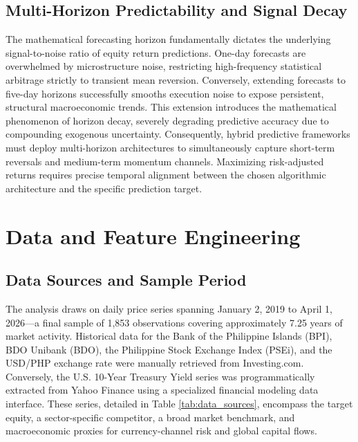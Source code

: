 \documentclass[12pt]{article}
\begin{document}
\subsection{Multi-Horizon Predictability and Signal Decay}
The mathematical forecasting horizon fundamentally dictates the underlying signal-to-noise ratio of equity return predictions. One-day forecasts are overwhelmed by microstructure noise, restricting high-frequency statistical arbitrage strictly to transient mean reversion. Conversely, extending forecasts to five-day horizons successfully smooths execution noise to expose persistent, structural macroeconomic trends. This extension introduces the mathematical phenomenon of horizon decay, severely degrading predictive accuracy due to compounding exogenous uncertainty. Consequently, hybrid predictive frameworks must deploy multi-horizon architectures to simultaneously capture short-term reversals and medium-term momentum channels. Maximizing risk-adjusted returns requires precise temporal alignment between the chosen algorithmic architecture and the specific prediction target.

\section{Data and Feature Engineering}
\label{sec:data}

\subsection{Data Sources and Sample Period}

The analysis draws on daily price series spanning January 2, 2019 to April 1, 2026---a final sample of 1,853 observations covering approximately 7.25 years of market activity. Historical data for the Bank of the Philippine Islands (BPI), BDO Unibank (BDO), the Philippine Stock Exchange Index (PSEi), and the USD/PHP exchange rate were manually retrieved from Investing.com. Conversely, the U.S. 10-Year Treasury Yield series was programmatically extracted from Yahoo Finance using a specialized financial modeling data interface. These series, detailed in Table \ref{tab:data_sources}, encompass the target equity, a sector-specific competitor, a broad market benchmark, and macroeconomic proxies for currency-channel risk and global capital flows.
\end{document}
